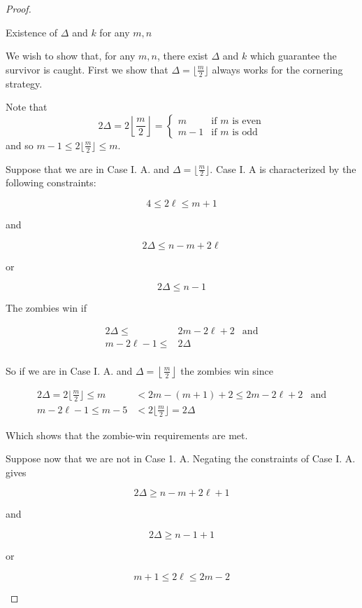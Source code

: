 \begin{proof}
\begin{description}
\item Existence of $\Delta$ and $k$ for any $m,n$ \label{thm q_m_n 4}

We wish to show that, for any $m, n$, there exist $\Delta$ and $k$
which guarantee the survivor is caught.
First we show that $\Delta = \lfloor \frac{m}{2} \rfloor$ always
works for the cornering strategy.

Note that
\[
2\Delta = 2 \left\lfloor \frac{m}{2} \right\rfloor =
\begin{cases}
m & \text{if $m$ is even} \\
m -1 & \text{if $m$ is odd}
\end{cases}
\]
and so $m -1 \leq 2 \lfloor \frac{m}{2} \rfloor \leq m$.

Suppose that we are in Case I. A. and $\Delta = \lfloor \frac{m}{2} \rfloor$.
Case I. A is characterized by the following constraints:

\[ 4 \leq 2 \ell \leq m+1 \]
\begin{center}and\end{center}
\[ 2\Delta \leq n - m + 2\ell \]
\begin{center}or\end{center}
\[ 2\Delta \leq n-1 \]

The zombies win if

\begin{align*}
 2 \Delta \leq      & 2 m- 2 \ell + 2 & \text{and} \\
 m - 2\ell  -1 \leq & 2 \Delta                     \\
\end{align*}

So if we are in Case I. A. and $\Delta = \left\lfloor \frac{m}{2} \right\rfloor$ the zombies win since

\begin{align*}
  2 \Delta = 2 \lfloor \frac{m}{2} \rfloor \leq m &< 2m - (m+1) + 2\leq 2 m- 2 \ell + 2 & \text{and}\\
  m - 2\ell -1 \leq m - 5 &< 2 \lfloor \frac{m}{2} \rfloor = 2 \Delta
\end{align*}

Which shows that the zombie-win requirements are met.

Suppose now that we are not in Case 1. A. Negating the constraints of Case I. A. gives

\[ 2\Delta \geq n - m + 2\ell +1 \]
\begin{center}and\end{center}
\[ 2 \Delta \geq n - 1 + 1 \]
\begin{center}or\end{center}
\[ m+1 \leq 2 \ell \leq 2m -2 \]


\end{description}
\end{proof}
